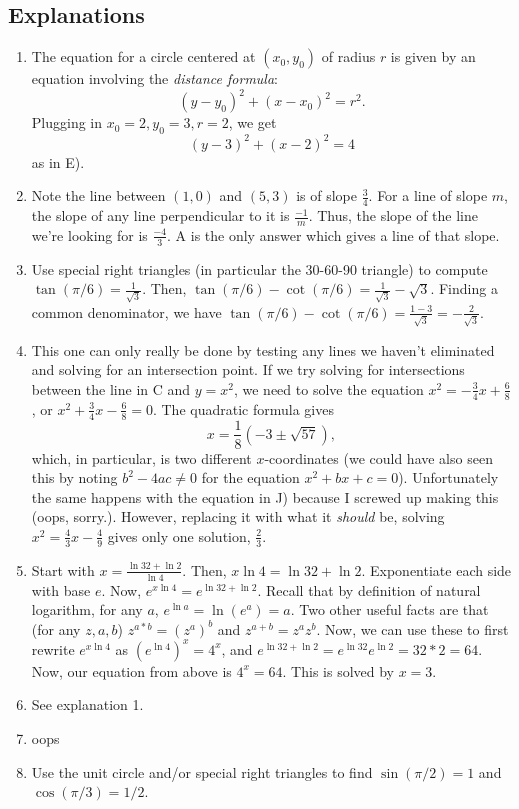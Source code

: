 \documentclass[english]{article}
\theoremstyle{remark}
\theoremstyle{definition}
\begin{document}
	\subsection*{Explanations}
	\begin{enumerate}
	\item The equation for a circle centered at $(x_0,y_0)$ of radius $r$ is given by an equation involving the \emph{distance formula}:$$(y-y_0)^2+(x-x_0)^2=r^2.$$ Plugging in $x_0=2,y_0=3,r=2$, we get $$(y-3)^2+(x-2)^2=4$$ as in E).
	\item Note the line between $(1,0)$ and $(5,3)$ is of slope $\frac{3}{4}$. For a line of slope $m$, the slope of any line perpendicular to it is $\frac{-1}{m}$. Thus, the slope of the line we're looking for is $\frac{-4}{3}$. A is the only answer which gives a line of that slope.
	\item Use special right triangles (in particular the 30-60-90 triangle) to compute $\tan(\pi/6)=\frac{1}{\sqrt{3}}$. Then, $\tan(\pi/6)-\cot(\pi/6)=\frac{1}{\sqrt{3}}-\sqrt{3}$. Finding a common denominator, we have $ \tan(\pi/6)-\cot(\pi/6)=\frac{1-3}{\sqrt{3}}=-\frac{2}{\sqrt{3}}$.\
\item This one can only really be done by testing any lines we haven't eliminated and solving for an intersection point. If we try solving for intersections between the line in C and $y=x^2$, we need to solve the equation $x^2=-\frac{3}{4}x+\frac{6}{8}$, or $x^2+\frac{3}{4}x-\frac{6}{8}=0$. The quadratic formula gives $$x=\frac{1}{8} \left(-3\pm\sqrt{57}\right),$$ which, in particular, is two different $x$-coordinates (we could have also seen this by noting $b^2-4ac\neq 0$ for the equation $x^2+bx+c=0$). Unfortunately the same happens with the equation in J) because I screwed up making this (oops, sorry.). However, replacing it with what it \textit{should} be, solving $x^2=\frac{4}{3}x-\frac{4}{9}$ gives only one solution, $\frac{2}{3}$. 
\item
Start with $x=\frac{\ln32+\ln2}{\ln4}$. Then, $x\ln4=\ln32+\ln2$. Exponentiate each side with base $e$. Now, $e^{x\ln 4}=e^{\ln32+\ln2}$. Recall that by definition of natural logarithm, for any $a$, $e^{\ln a}=\ln(e^a)=a$. Two other useful facts are that (for any $z,a,b$) $z^{a*b}=(z^a)^b$ and $z^{a+b}=z^az^b$. Now, we can use these to first rewrite $e^{x\ln4}$ as $(e^{\ln4})^x=4^x$, and $e^{\ln 32+\ln2}=e^{\ln 32}e^{\ln2}=32*2=64$. Now, our equation from above is $4^x=64$. This is solved by $x=3$.

\item See explanation 1.
\item oops
\item Use the unit circle and/or special right triangles to find $\sin(\pi/2)=1$ and $\cos(\pi/3)=1/2$.
	\end{enumerate}
	
\end{document}
